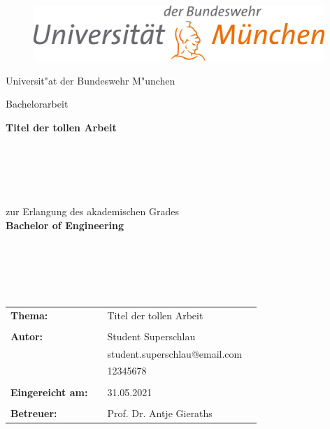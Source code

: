 

\thispagestyle{empty}

\begin{figure}[t]
	\centering
	\includegraphics[width=11.0cm]{bilder/logo/uni_logo_rgb.jpg}
\end{figure}

\begin{center}
	\Large{Universit"at der Bundeswehr M"unchen}\\
\end{center}

\begin{center}
	\Large
	Bachelorarbeit\\
\end{center}

\begin{center}	
	\baselineskip8mm
	\LARGE
	\bfseries{Titel der tollen Arbeit}\\
	\begin{verbatim}
		
	\end{verbatim}
	
\end{center}


\begin{verbatim}
	
	
\end{verbatim}


\begin{center}
	\baselineskip8mm
	zur Erlangung des akademischen Grades \\ \textbf{\large Bachelor of Engineering}
\end{center}


\begin{verbatim}
	
	
	
	
\end{verbatim}


\begin{flushleft}
	\begin{tabular}{llll}
		\textbf{Thema:} & & \parbox[t]{10cm}{Titel der tollen Arbeit} & \\
		& & \\
		\textbf{Autor:} & & Student Superschlau \\
		& & student.superschlau@email.com & \\
		& & 12345678 & \\
		& & \\
		\textbf{Eingereicht am:} & & 31.05.2021 &\\
		& & \\
		\textbf{Betreuer:} & & Prof. Dr. Antje Gieraths &\\
	\end{tabular}
\end{flushleft}
